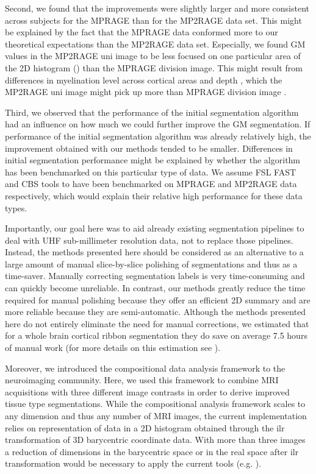 Second, we found that the improvements were slightly larger and more consistent across subjects for the MPRAGE than for the MP2RAGE data set. This might be explained by the fact that the MPRAGE data conformed more to our theoretical expectations than the MP2RAGE data set. Especially, we found GM values in the MP2RAGE uni image to be less focused on one particular area of the 2D histogram () than the MPRAGE division image. This might result from differences in myelination level across cortical areas and depth \cite{Sereno2013, Dick2012, DeMartino2015myelin}, which the MP2RAGE uni image might pick up more than MPRAGE division image \cite{Marques2013}.

Third, we observed that the performance of the initial segmentation algorithm had an influence on how much we could further improve the GM segmentation. If performance of the initial segmentation algorithm was already relatively high, the improvement obtained with our methods tended to be smaller. Differences in initial segmentation performance might be explained by whether the algorithm has been benchmarked on this particular type of data. We assume FSL FAST and CBS tools to have been benchmarked on MPRAGE and MP2RAGE data respectively, which would explain their relative high performance for these data types.

Importantly, our goal here was to aid already existing segmentation pipelines to deal with UHF sub-millimeter resolution data, not to replace those pipelines. Instead, the methods presented here should be considered as an alternative to a large amount of manual slice-by-slice polishing of segmentations and thus as a time-saver. Manually correcting segmentation labels is very time-consuming and can quickly become unreliable. In contrast, our methods greatly reduce the time required for manual polishing because they offer an efficient 2D summary and are more reliable because they are semi-automatic. Although the methods presented here do not entirely eliminate the need for manual corrections, we estimated that for a whole brain cortical ribbon segmentation they do save on average 7.5 hours of manual work (for more details on this estimation see ).

Moreover, we introduced the compositional data analysis framework to the neuroimaging community. Here, we used this framework to combine MRI acquisitions with three different image contrasts in order to derive improved tissue type segmentations. While the compositional analysis framework scales to any dimension and thus any number of MRI images, the current implementation relies on representation of data in a 2D histogram obtained through the ilr transformation of 3D barycentric coordinate data. With more than three images a reduction of dimensions in the barycentric space or in the real space after ilr transformation would be necessary to apply the current tools (e.g. \cite{PCA2002}).

